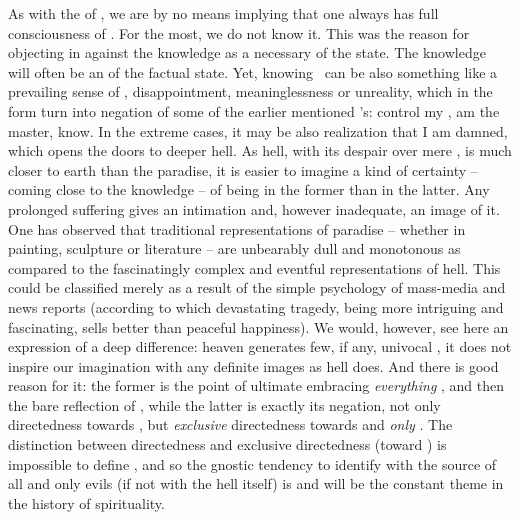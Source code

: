 As with the  of \yes, we are by no means implying that
one always has full consciousness of \No.  For the most, we  do not
know it.  This was the reason for objecting in  against the
 knowledge as a necessary  of the  state.  The
 knowledge will often be an  of the factual
state. Yet,  knowing \No\ can be also something like a
prevailing sense of , disappointment, meaninglessness or
unreality, which in the  form turn into negation of some of the
earlier mentioned 's:  control my ,  am the
master,  know. In the extreme cases, it may be also 
realization that I am damned, which opens the doors to deeper hell. As hell,
with its despair over mere , is much closer to earth than the
 paradise, it is easier to imagine a kind of certainty -- coming
close to the  knowledge -- of being in the former than in the latter.
Any prolonged suffering gives an intimation and, however inadequate, an image of
it.  One has observed that traditional representations of paradise -- whether in
painting, sculpture or literature -- are unbearably dull and monotonous as
compared to the fascinatingly complex and eventful representations of hell.
This could be classified merely as a result of the simple psychology of
mass-media and news reports (according to which devastating tragedy, being more
intriguing and fascinating, sells better than peaceful happiness). We would,
however, see here an expression of a deep difference: heaven generates few, if
any, univocal , it does not inspire our imagination with any
definite images as hell does. And there is good reason for it: the former is the
point of ultimate  embracing {\em everything} , and
then the bare reflection of , while the latter is exactly its
negation, not only directedness towards , but {\em exclusive}
directedness towards  and {\em only} . The
distinction between directedness and exclusive directedness (toward ) is impossible to define , and so the gnostic tendency to
identify  with the source of all and only evils (if not
with the hell itself) is and will be the constant theme in the history of
spirituality.


